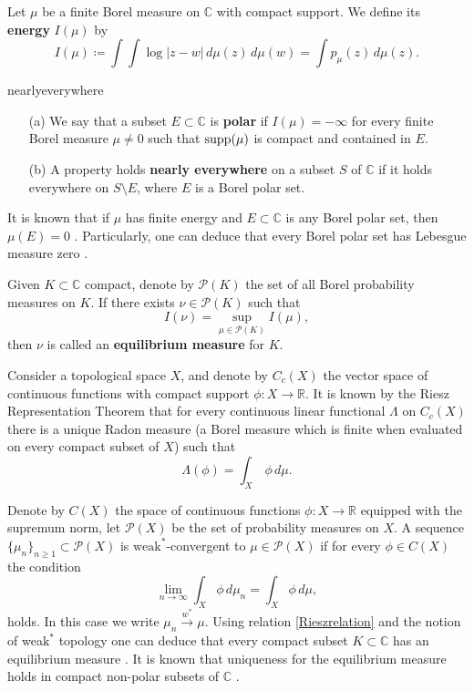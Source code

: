 \begin{mydef}{}{}
Let $\mu$ be a finite Borel measure on $\mathbb{C}$ with compact support. We define its {\bf energy} $I(\mu)$ by
$$I(\mu) \coloneqq \int \int \log|z-w|\,d\mu(z)\,d\mu(w) = \int p_\mu(z) \,d\mu(z).$$ 
\end{mydef}

\begin{mydef}{}{nearlyeverywhere}
\begin{itemize}
\item[ (a)] We say that a subset $E\subset \mathbb{C}$ is {\bf polar} if $I(\mu)=-\infty$ for every finite Borel measure $\mu \neq 0$ such that $\text{supp}(\mu)$ is compact and contained in $E$.\\
\item [(b)] A property holds {\bf nearly everywhere} on a subset $S$ of $\mathbb{C}$ if it holds everywhere on $S\setminus E$, where $E$ is a Borel polar set.
\end{itemize}
\end{mydef}

It is known that if $\mu$ has finite energy and $E\subset \mathbb{C}$ is any Borel polar set, then $\mu(E)=0$ \cite[Theorem 3.2.3]{ransford}. Particularly, one can deduce that every Borel polar set has Lebesgue measure zero \cite[Corollary 3.2.4]{ransford}.

\begin{mydef}{}{}
Given $K\subset \mathbb{C}$ compact, denote by $\mathcal{P}(K)$ the set of all Borel probability measures on $K$. If there exists $\nu\in \mathcal{P}(K)$ such that
$$I(\nu) = \sup_{\mu \in \mathcal{P}(K)} I(\mu),$$
then $\nu$ is called an {\bf equilibrium measure} for $K$.
\end{mydef} 

Consider a topological space $X$, and denote by $C_c(X)$ the vector space of continuous functions with compact support $\phi:X\rightarrow \mathbb{R}$. It is known by the Riesz Representation Theorem \cite[Theorem A.3.2]{ransford} that for every continuous linear functional $\Lambda$ on $C_c(X)$ there is a unique Radon measure (a Borel measure which is finite when evaluated on every compact subset of $X$) such that
\begin{equation}\label{Rieszrelation}
\Lambda(\phi) = \int_X\,\phi\,d\mu.
\end{equation}

Denote by $C(X)$ the space of continuous functions $\phi:X\rightarrow \mathbb
{R}$ equipped with the supremum norm, let $\mathcal{P}(X)$ be the set of probability measures on $X$. A sequence $\{\mu_n\}_{n\geq 1}\subset \mathcal{P}(X)$ is $\text{weak}^*$-convergent to $\mu\in \mathcal{P}(X)$ if for every $\phi\in C(X)$ the condition
$$\lim_{n\rightarrow \infty} \int_X \phi\,d\mu_n = \int_X \phi\,d\mu,$$ 
holds. In this case we write $\mu_n \overset{w^*}{\to} \mu$. Using relation \eqref{Rieszrelation} and the notion of wea$\text{k}^*$ topology one can deduce that every compact subset $K\subset \mathbb{C}$ has an equilibrium measure \cite[Theorem 3.3.2]{ransford}. It is known that uniqueness for the equilibrium measure holds in compact non-polar subsets of $\mathbb{C}$ \cite[Theorem 3.7.6]{ransford}.

